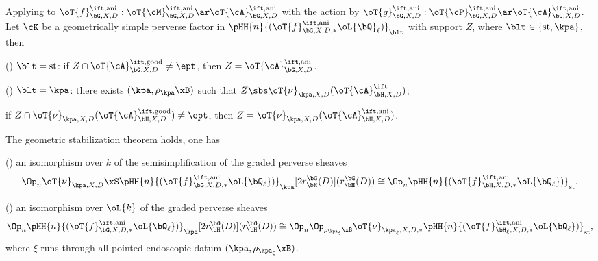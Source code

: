 \documentclass[a4paper, twoside]{article}
\begin{document}
\begin{thm}
	Applying to $\oT{f}_{\bG,X,D}^{\ift,\text{ani}}:\oT{\cM}_{\bG,X,D}^{\ift,\text{ani}}\ar\oT{\cA}_{\bG,X,D}^{\ift,\text{ani}}$ with the action by $\oT{g}_{\bG,X,D}^{\ift,\text{ani}}:\oT{\cP}_{\bG,X,D}^{\ift,\text{ani}}\ar\oT{\cA}_{\bG,X,D}^{\ift,\text{ani}}$. Let $\cK$ be a geometrically simple perverse factor in $\pHH{n}{(\oT{f}_{\bG,X,D,*}^{\ift,\text{ani}}\oL{\bQ}_{\ell})}_{\blt}$ with support $Z$, where $\blt\in\{\text{st},\kpa\}$, then
	\begin{enr}[label=(\arabic*)]
		\item (\cite[Theorem~7.8.3]{Ngo2010Lemme}) $\blt=\text{st}$: if $Z\cap\oT{\cA}_{\bG,X,D}^{\ift,\text{good}}\neq\ept$, then $Z=\oT{\cA}_{\bG,X,D}^{\ift,\text{ani}}$.
		\item (\cite[Theorem~7.8.5]{Ngo2010Lemme}) $\blt=\kpa$: there exists $(\kpa,\rho_{\kpa}\xB)$ such that $Z\sbs\oT{\nu}_{\kpa,X,D}(\oT{\cA}_{\bH,X,D}^{\ift})$;

		if $Z\cap\oT{\nu}_{\kpa,X,D}(\oT{\cA}_{\bH,X,D}^{\ift,\text{good}})\neq\ept$, then $Z=\oT{\nu}_{\kpa,X,D}(\oT{\cA}_{\bH,X,D}^{\ift,\text{ani}})$.
	\end{enr}
\end{thm}



\begin{thm}
	The geometric stabilization theorem holds, one has
	\begin{itm}
		\item (\cite[Theorem~6.4.2]{Ngo2010Lemme}) an isomorphism over $k$ of the semisimplification of the graded perverse sheaves
	\[
	  \Op_{n}\oT{\nu}_{\kpa,X,D}\xS \pHH{n}{(\oT{f}^{\ift,\text{ani}}_{\bG,X,D,*}\oL{\bQ_{\ell}})}_{\kpa}[2r_{\bH}^{\bG}(D)](r_{\bH}^{\bG}(D))\cong\Op_{n}\pHH{n}{(\oT{f}^{\ift,\text{ani}}_{\bH,X,D,*}\oL{\bQ_{\ell}})}_{\text{st}}.
  	\]
		\item (\cite[Theorem~6.4.1]{Ngo2010Lemme}) an isomorphism over $\oL{k}$ of the graded perverse sheaves
	\[
		\Op_{n}\pHH{n}{(\oT{f}^{\ift,\text{ani}}_{\bG,X,D,*}\oL{\bQ_{\ell}})}_{\kpa}[2r_{\bH}^{\bG}(D)](r_{\bH}^{\bG}(D))\cong\Op_{n}\Op_{\rho_{\kpa_{\xi}}\xB}\oT{\nu}_{\kpa_{\xi},X,D,*}\pHH{n}{(\oT{f}^{\ift,\text{ani}}_{\bH_{\xi},X,D,*}\oL{\bQ_{\ell}})}_{\text{st}},
	\]
	where $\xi$ runs through all pointed endoscopic datum $(\kpa,\rho_{\kpa_{\xi}}\xB)$.
	\end{itm}
\end{thm}
\end{document}

